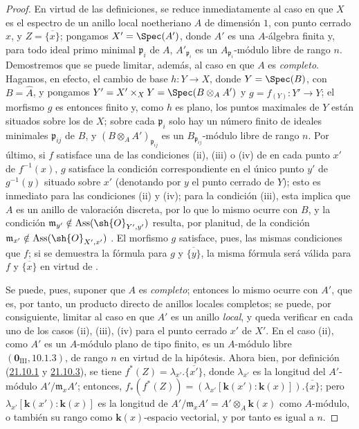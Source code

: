 \begin{proof}
En virtud de las definiciones, se reduce inmediatamente al caso en que $X$ es el espectro de un anillo local noetheriano $A$ de dimensión $1$, con punto cerrado $x$, y $Z=\overline{\{x\}}$;
pongamos $X'=\Spec(A')$, donde $A'$ es una $A$-álgebra finita y, para todo ideal primo minimal $\mathfrak{p}_i$ de $A$, $A'_{\mathfrak{p}_i}$ es un $A_{\mathfrak{p}_i}$-módulo libre de rango $n$.
Demostremos que se puede limitar, además, al caso en que $A$ es \emph{completo}.
Hagamos, en efecto, el cambio de base $h:Y\to X$, donde $Y=\Spec(B)$, con $B=\widehat{A}$, y pongamos
$Y'=X'\times_XY=\Spec(B\otimes_AA')$ y $g=f_{(Y)}:Y'\to Y$;
el morfismo $g$ es entonces finito y, como $h$ es plano, los puntos maximales de $Y$ están situados sobre los de $X$;
sobre cada $\mathfrak{p}_i$ solo hay un número finito de ideales minimales $\mathfrak{p}_{ij}$ de $B$, y $(B\otimes_AA')_{\mathfrak{p}_{ij}}$ es un $B_{\mathfrak{p}_{ij}}$-módulo libre de rango $n$.
Por último, si $f$ satisface una de las condiciones (ii), (iii) o (iv) de  en cada punto $x'$ de $f^{-1}(x)$, $g$ satisface la condición correspondiente en el único punto $y'$ de $g^{-1}(y)$ situado sobre $x'$ (denotando por $y$ el punto cerrado de $Y$);
esto es inmediato para las condiciones (ii) y (iv);
para la condición (iii), esta implica que $A$ es un anillo de valoración discreta, por lo que lo mismo ocurre con $B$, y la condición
$\mathfrak{m}_{y'}\notin\operatorname{Ass}(\sh{O}_{Y',y'})$ resulta, por planitud, de la condición $\mathfrak{m}_{x'}\notin\operatorname{Ass}(\sh{O}_{X',x'})$ .
El morfismo $g$ satisface, pues, las mismas condiciones que $f$;
si se demuestra la fórmula  para $g$ y $\overline{\{y\}}$, la misma fórmula será válida para $f$ y $\overline{\{x\}}$ en virtud de .

Se puede, pues, suponer que $A$ es \emph{completo};
entonces lo mismo ocurre con $A'$, que es, por tanto, un producto directo de anillos locales completos;
se puede, por consiguiente, limitar al caso en que $A'$ es un anillo \emph{local}, y queda verificar  en cada uno de los casos (ii), (iii), (iv) para el punto cerrado $x'$ de $X'$.
En el caso (ii), como $A'$ es un $A$-módulo plano de tipo finito, es un $A$-módulo libre $(\mathbf{0}_{\mathrm{III}},10.1.3)$, de rango $n$ en virtud de la hipótesis.
Ahora bien, por definición (\hyperref[IV.21.10.1]{21.10.1} y \hyperref[IV.21.10.3]{21.10.3}), se tiene
$f^*(Z)=\lambda_{x'}.\overline{\{x'\}}$,
donde $\lambda_{x'}$ es la longitud del $A'$-módulo $A'/\mathfrak{m}_xA'$; entonces,
$f_*(f^*(Z))=(\lambda_{x'}[\boldsymbol{k}(x'): \boldsymbol{k}(x)]).\overline{\{x\}}$;
pero $\lambda_{x'}[\boldsymbol{k}(x'): \boldsymbol{k}(x)]$ es la longitud de $A'/\mathfrak{m}_xA'=A'\otimes_A\boldsymbol{k}(x)$ como $A$-módulo, o también su rango como $\boldsymbol{k}(x)$-espacio vectorial, y por tanto es igual a $n$.


\end{proof}
